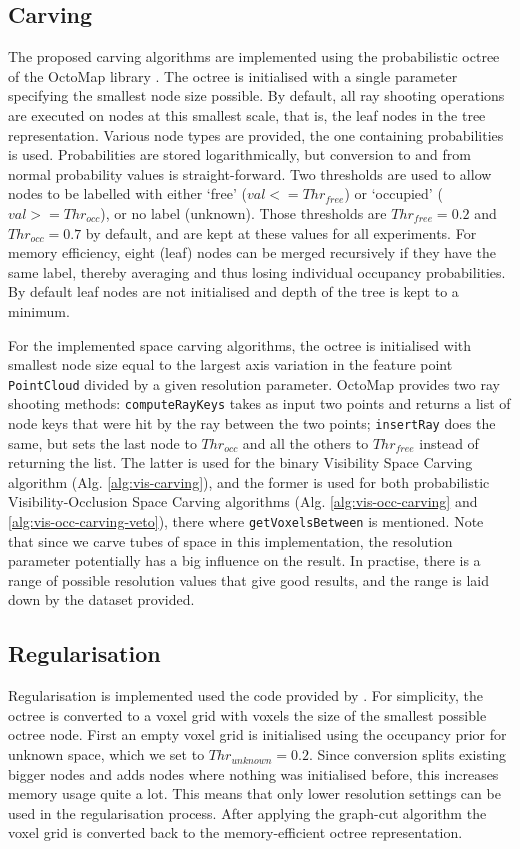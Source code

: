 \subsection{Carving}
The proposed carving algorithms are implemented using the probabilistic octree of the OctoMap library \cite{Wurm2010}. The octree is initialised with a single parameter specifying the smallest node size possible. By default, all ray shooting operations are executed on nodes at this smallest scale, that is, the leaf nodes in the tree representation. Various node types are provided, the one containing probabilities is used. Probabilities are stored logarithmically, but conversion to and from normal probability values is straight-forward. Two thresholds are used to allow nodes to be labelled with either `free' ($val <= Thr_{free}$) or `occupied' ($val >= Thr_{occ}$), or no label (unknown). Those thresholds are $Thr_{free} = 0.2$ and $Thr_{occ} = 0.7$ by default, and are kept at these values for all experiments. For memory efficiency, eight (leaf) nodes can be merged recursively if they have the same label, thereby averaging and thus losing individual occupancy probabilities. By default leaf nodes are not initialised and depth of the tree is kept to a minimum.

For the implemented space carving algorithms, the octree is initialised with smallest node size equal to the largest axis variation in the feature point \texttt{PointCloud} divided by a given resolution parameter. OctoMap provides two ray shooting methods: \texttt{computeRayKeys} takes as input two points and returns a list of node keys that were hit by the ray between the two points; \texttt{insertRay} does the same, but sets the last node to $Thr_{occ}$ and all the others to $Thr_{free}$ instead of returning the list. The latter is used for the binary Visibility Space Carving algorithm (Alg. \ref{alg:vis-carving}), and the former is used for both probabilistic Visibility-Occlusion Space Carving algorithms (Alg. \ref{alg:vis-occ-carving} and \ref{alg:vis-occ-carving-veto}), there where \texttt{getVoxelsBetween} is mentioned. Note that since we carve tubes of space in this implementation, the resolution parameter potentially has a big influence on the result. In practise, there is a range of possible resolution values that give good results, and the range is laid down by the dataset provided.

\subsection{Regularisation}
Regularisation is implemented used the code provided by . For simplicity, the octree is converted to a voxel grid with voxels the size of the smallest possible octree node. First an empty voxel grid is initialised using the occupancy prior for unknown space, which we set to $Thr_{unknown} = 0.2$. Since conversion splits existing bigger nodes and adds nodes where nothing was initialised before, this increases memory usage quite a lot. This means that only lower resolution settings can be used in the regularisation process. After applying the graph-cut algorithm the voxel grid is converted back to the memory-efficient octree representation.

